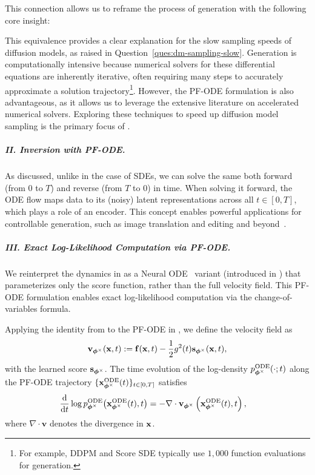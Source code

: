 This connection allows us to reframe the process of generation with the following core insight:

This equivalence provides a clear explanation for the slow sampling speeds of diffusion models, as raised in Question~\ref{ques:dm-sampling-slow}. Generation is computationally intensive because numerical solvers for these differential equations are inherently iterative, often requiring many steps to accurately approximate a solution trajectory\footnote{For example, DDPM and Score SDE typically use $1,000$ function evaluations for generation.}. However, the PF-ODE formulation is also advantageous, as it allows us to leverage the extensive literature on accelerated numerical solvers. Exploring these techniques to speed up diffusion model sampling is the primary focus of .



\subparagraph{II. Inversion with PF-ODE.} As discussed, unlike in the case of SDEs, we can solve the same  both forward (from $0$ to $T$) and reverse (from $T$ to $0$) in time. When solving it forward, the ODE flow maps data to its (noisy) latent representations across all $t \in [0,T]$, which plays a role of an encoder. This concept enables powerful applications for controllable generation, such as image translation and editing and beyond~\citep{mokady2023null,su2022dual}.

\subparagraph{III. Exact Log-Likelihood Computation via PF-ODE.}
We reinterpret the dynamics in  as a Neural ODE~\citep{chen2018neural} variant (introduced in ) that parameterizes only the score function, rather than the full velocity field. This PF-ODE formulation enables exact log-likelihood computation via the change-of-variables formula.

Applying the identity from  to the PF-ODE in , we define the velocity field as
\[
{\mathbf{v}}_{{\bm{\phi}^\times}}({\mathbf{x}}, t) := {\mathbf{f}}({\mathbf{x}}, t) - \frac{1}{2}g^2(t){\mathbf{s}}_{\bm{\phi}^\times}({\mathbf{x}}, t),
\]
with the learned score ${\mathbf{s}}_{\bm{\phi}^\times}$. The time evolution of the log-density $p^{\textup{ODE}}_{\bm{\phi}^\times}(\cdot; t)$ along the PF-ODE trajectory $\{{\mathbf{x}}^{\mathrm{ODE}}_{\bm{\phi}^\times}(t)\}_{t \in [0, T]}$ satisfies
\begin{align*}
    \frac{\mathop{}\!\mathrm{d}}{\mathop{}\!\mathrm{d} t} \log p^{\textup{ODE}}_{\bm{\phi}^\times}\big({\mathbf{x}}^{\mathrm{ODE}}_{\bm{\phi}^\times}(t), t \big) 
    &= -\nabla \cdot {\mathbf{v}}_{{\bm{\phi}^\times}}\left({\mathbf{x}}^{\mathrm{ODE}}_{\bm{\phi}^\times}(t), t  \right),
\end{align*}
where $\nabla \cdot \mathbf{v}$ denotes the divergence in ${\mathbf{x}}$.


